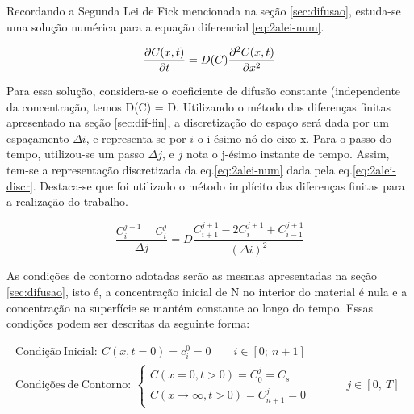 Recordando a Segunda Lei de Fick mencionada na seção \ref{sec:difusao}, estuda-se uma solução numérica para a equação diferencial \ref{eq:2alei-num}.

\begin{equation}
\label{eq:2alei-num}
\pdv{C(x,t)}{t} = D(C)\pdv[2]{C(x,t)}{x}
\end{equation}

Para essa solução, considera-se o coeficiente de difusão constante (independente da concentração, temos D(C) = D. Utilizando o método das diferenças finitas apresentado na seção \ref{sec:dif-fin}, a discretização do espaço será dada por um espaçamento {$\Delta i$}, e representa-se por $i$ o i-ésimo nó do eixo x. Para o passo do tempo, utilizou-se um passo {$\Delta j$}, e $j$ nota o j-ésimo instante de tempo. Assim, tem-se a representação discretizada da eq.\ref{eq:2alei-num} dada pela eq.\ref{eq:2alei-discr}. Destaca-se que foi utilizado o método implícito das diferenças finitas para a realização do trabalho.

\begin{equation}
\label{eq:2alei-discr}
\dfrac{C_i^{j+1} - C_i^j}{\Delta j} = D\dfrac{C_{i+1}^{j+1} - 2C_i^{j+1} + C_{i-1}^{j+1}}{(\Delta i)^2}
\end{equation}



As condições de contorno adotadas serão as mesmas apresentadas na seção \ref{sec:difusao}, isto é, a concentração inicial de N no interior do material é nula e a concentração na superfície se mantém constante ao longo do tempo. Essas condições podem ser descritas da seguinte forma:

\begin{gather*}
		\mathrm{Condição\ Inicial: }\ C(x, t=0) = c_i^0 = 0 \qquad i \in [0;\ n+1] \\
		\mathrm{Condições\ de\ Contorno:}\ 
		\left\{
    		\begin{array}{l}
      			C(x=0, t>0) = C_0^j = C_s  \\
				C(x\rightarrow\infty, t>0) = C_{n+1}^j = 0 
			\end{array}
    		\begin{array}{l}
      		\qquad \\
			\qquad \\	   
    		\end{array}
    		\begin{array}{l}
    			j \in [0,\ T] 
    		\end{array}
		\right.	
\end{gather*}


